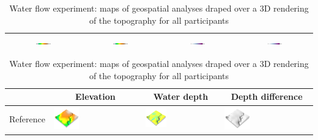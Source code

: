 \documentclass[Afour,sageh,times]{sagej}
\newcommand{\ra}[1]{\renewcommand{\arraystretch}{#1}}
\begin{document}
\begin{table}[h]
\begin{tabular}{m{} m{} m{} m{}}
%
\multicolumn{1}{c}{\includegraphics[width=0.22\textwidth]{images/legends/elevation_legend_5.pdf}} &
\multicolumn{1}{c}{\includegraphics[width=0.22\textwidth]{images/legends/elevation_legend_5.pdf}} &
\multicolumn{1}{c}{\includegraphics[width=0.22\textwidth]{images/legends/stdev_legend.pdf}} &
\multicolumn{1}{c}{\includegraphics[width=0.22\textwidth]{images/legends/stdev_diff_legend.pdf}}\\
%
\bottomrule
\end{tabular}
\label{table:water_flow_stats} 
%
\vspace*{1.5em}
%
\caption{Water flow experiment: maps of geospatial analyses draped over a 3D rendering of the topography  for all participants}
\ra{1.3}
\begin{tabular}{m{} m{} m{} m{}}
\toprule
& \multicolumn{1}{c}{Elevation} & \multicolumn{1}{c}{Water depth} & \multicolumn{1}{c}{Depth difference}\\
\midrule
%
Reference & 
\includegraphics[width=0.3\textwidth]{images/render_3d/participants/dem_5.png} &
\includegraphics[width=0.3\textwidth]{images/render_3d/participants/depth_5.png} &
\includegraphics[width=0.3\textwidth]{images/render_3d/participants/dem_difference_5.png}\\

\end{tabular}
\end{table}
\end{document}
